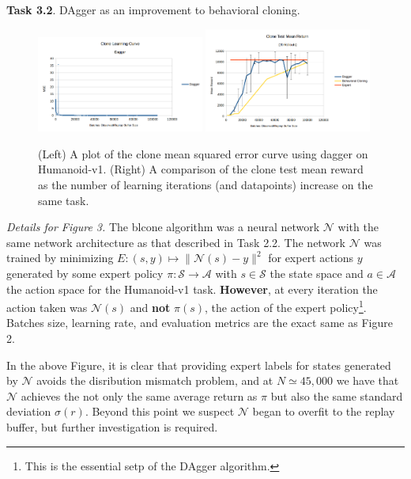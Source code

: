 \documentclass[11pt]{amsart}
\theoremstyle{definition}
\numberwithin{theorem}{section}
\numberwithin{definition}{section}
\numberwithin{equation}{section}
\def\scripta{{\mathcal A}}
\def\scriptn{{\mathcal N}}
\def\scripts{{\mathcal S}}
\begin{document}
\newpage
\medskip \noindent \textbf{Task 3.2}. DAgger as an improvement to behavioral cloning.

    \begin{figure}[H]
    \includegraphics[width=0.49\textwidth]{dagger_clone_learning.png}
    \includegraphics[width=0.49\textwidth]{dagger_clone_test.png}
    \caption{(Left) A plot of the clone mean squared error curve using dagger on Humanoid-v1. (Right) A comparison of the clone test mean reward as the number of learning iterations (and datapoints) increase on the same task.}
    \end{figure}
    \emph{Details for Figure 3.} The blcone algorithm was a neural network  $\scriptn$ with the same network architecture as that described in Task 2.2. The network  $\scriptn$  was trained by minimizing $E: (s,y) \mapsto \|\scriptn(s) - y\|^2$ for expert actions $y$ generated by some expert policy $\pi: \scripts \to \scripta$ with $s \in \scripts$ the state space and $a \in \scripta$ the action space for the Humanoid-v1 task. \textbf{However}, at every iteration the action taken was $\scriptn(s)$ and \textbf{not} $\pi(s)$, the action of the expert policy\footnote{This is the essential setp of the DAgger algorithm.}.  Batches size, learning rate, and evaluation metrics are the exact same as Figure 2.

    In the above Figure, it is clear that providing expert labels for states generated by $\scriptn$ avoids the disribution mismatch problem, and at $N \simeq 45,000$ we have that $\scriptn$ achieves the not only the same average return as $\pi$ but also the same standard deviation $\sigma(r).$ Beyond this point we suspect $\scriptn$ began to overfit to the replay buffer, but further investigation is required.
 
\end{document}

